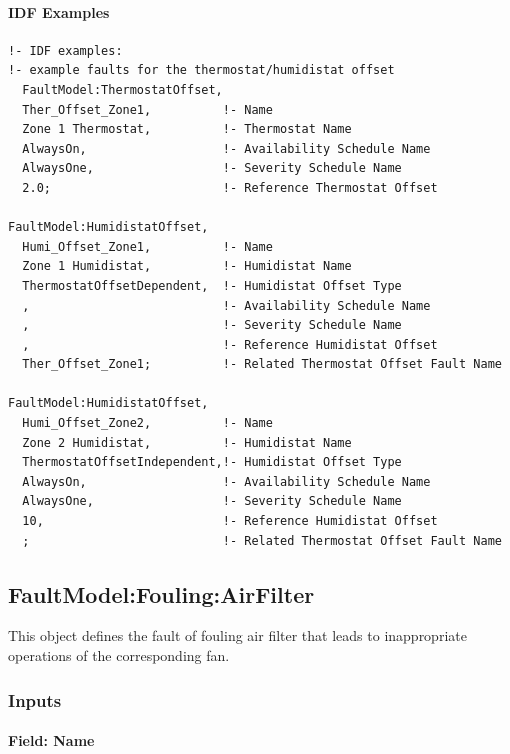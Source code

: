 \paragraph{IDF Examples}\label{an-example-of-idf-codes-for-the-thermostathumidistat-offset-fault-models}

\begin{lstlisting}
!- IDF examples:
!- example faults for the thermostat/humidistat offset
  FaultModel:ThermostatOffset,
  Ther_Offset_Zone1,          !- Name
  Zone 1 Thermostat,          !- Thermostat Name
  AlwaysOn,                   !- Availability Schedule Name
  AlwaysOne,                  !- Severity Schedule Name
  2.0;                        !- Reference Thermostat Offset

FaultModel:HumidistatOffset,
  Humi_Offset_Zone1,          !- Name
  Zone 1 Humidistat,          !- Humidistat Name
  ThermostatOffsetDependent,  !- Humidistat Offset Type
  ,                           !- Availability Schedule Name
  ,                           !- Severity Schedule Name
  ,                           !- Reference Humidistat Offset
  Ther_Offset_Zone1;          !- Related Thermostat Offset Fault Name

FaultModel:HumidistatOffset,
  Humi_Offset_Zone2,          !- Name
  Zone 2 Humidistat,          !- Humidistat Name
  ThermostatOffsetIndependent,!- Humidistat Offset Type
  AlwaysOn,                   !- Availability Schedule Name
  AlwaysOne,                  !- Severity Schedule Name
  10,                         !- Reference Humidistat Offset
  ;                           !- Related Thermostat Offset Fault Name
\end{lstlisting}

\subsection{FaultModel:Fouling:AirFilter}\label{faultmodelfoulingairfilter}

This object defines the fault of fouling air filter that leads to inappropriate operations of the corresponding fan.

\subsubsection{Inputs}\label{inputs-8-013}

\paragraph{Field: Name}\label{field-name-8-011}

